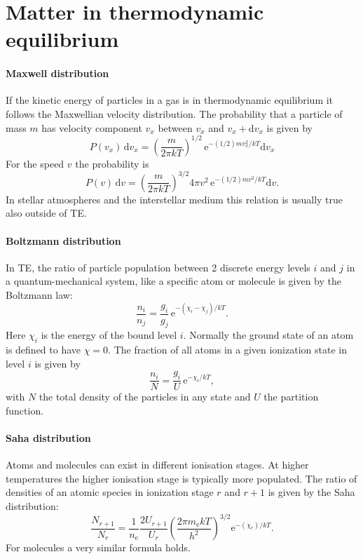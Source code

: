 \documentclass[12pt]{article}
\numberwithin{equation}{section}
\def\exp{\mathrm{e}}
\def\dd{\mathrm{d}}
\def\nelec{\ensuremath{n_\mathrm{e}}}
\newcommand{\be}{\begin{equation}}
\newcommand{\ee}{\end{equation}}
\begin{document}
\section{Matter in thermodynamic equilibrium}

\paragraph{Maxwell distribution}

If the kinetic energy of particles in a gas is in thermodynamic equilibrium it follows the Maxwellian velocity distribution. The probability that a particle of mass $m$ has velocity component $v_x$ between $v_x$ and $v_x+\dd v_x$ is given by
\be
P(v_x) \, \dd v_x = \left( \frac{m}{2\pi kT}  \right)^{1/2} \,  \exp^{-(1/2) m v_x^2 / kT }  \dd v_x
\ee
For the speed $v$ the probability is
\be
P(v) \, \dd v = \left( \frac{m}{2\pi kT}  \right)^{3/2} 4\pi v^2 \, \exp^{-(1/2) m v^2 / kT }  \dd v.
\ee
In stellar atmospheres and the interstellar medium this relation is usually true also outside of TE.

\paragraph{Boltzmann distribution}
In TE, the  ratio of particle population between 2 discrete energy levels $i$ and $j$ in a quantum-mechanical system, like a specific atom or molecule is given by the Boltzmann law:
\be
\frac{n_i}{n_j} = \frac{g_i}{g_j} \, \exp^{-(\chi_i- \chi_j)/kT}.
\ee
Here $\chi_i$ is the energy of the bound level $i$. Normally the ground state of an atom is defined to have $\chi=0$.
The fraction of all atoms in a given ionization state in level $i$ is given by
\be
\frac{n_i}{N} = \frac{g_i}{U} \, \exp^{-\chi_i/kT},
\ee
with $N$ the total density of the particles in any state and $U$ the partition function.

\paragraph{Saha distribution}
Atoms and molecules can exist in different ionisation stages. At higher temperatures the higher ionisation stage is typically more populated. The ratio of densities of an atomic species in ionization stage $r$ and $r+1$ is given by the Saha distribution:
\be
\frac{N_{r+1}}{N_r} = \frac{1}{\nelec} \frac{2 U_{r+1}}{U_r}  \left( \frac{2 \pi m_\mathrm{e} k T}{h^2} \right)^{3/2}  \exp^{-(\chi_r)/kT}.
\ee
For molecules a very similar formula holds.
\end{document}
